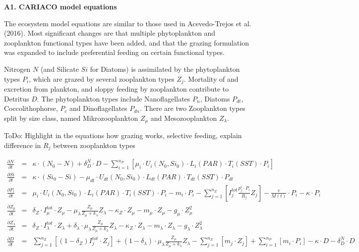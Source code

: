 \documentclass[11pt,letterpaper,english]{article}
\begin{document}
\newcommand{\etal}{{\em et al.}}
\newcommand{\ux}{{\underline{x}}}
\newcommand{\tdt}{{t}} 

{\bf {\large A1. CARIACO model equations}} 

The ecosystem model equations are similar to those used in Acevedo-Trejos et al. (2016).
Most significant changes are that multiple phytoplankton and zooplankton functional types have been added, and that the grazing formulation was expanded to include preferential feeding on certain functional types.

Nitrogen $N$ (and Silicate $Si$ for Diatoms) is assimilated by the phytoplankton types $P_i$, which are grazed by several zooplankton types $Z_j$. Mortality of and excretion from plankton, and sloppy feeding by zooplankton contribute to Detritus $D$. The phytoplankton types include Nanoflagellates $P_{n}$, Diatoms $P_{dt}$, Coccolithophorse, $P_{c}$ and Dinoflagellates $P_{dn}$. There are two Zooplankton types split by size class, named Mikrozooplankton $Z_{\mu}$ and Mesozooplankton $Z_{\lambda}$.

ToDo:  
Highlight in the equations how grazing works, selective feeding, explain difference in $R_j$ between zooplankton types

\begin{eqnarray}
\frac{\partial N}{\partial t} & = & 
\kappa \cdot \left(N_{0} - N\right) + 
\delta^{N}_{D} \cdot D -
\sum_{i=1}^{n_P} [\mu_i \cdot U_{i}(N_0,Si_0)\cdot L_i(PAR)\cdot T_i(SST) \cdot P_{i}] 
\nonumber \\
\frac{\partial Si}{\partial t} & = & 
\kappa \cdot \left(Si_{0} - Si\right) 
- \mu_{dt} \cdot U_{dt}(N_0,Si_0) \cdot L_{dt}(PAR)\cdot T_{dt}(SST) \cdot P_{dt}
\nonumber \\
\frac{\partial P_{i}}{\partial t} & = & 
\mu_{i} \cdot U_{i}(N_0,Si_0)\cdot L_{i}(PAR)\cdot T_{i}(SST) \cdot P_{i}
- m_{i} \cdot P_{i}
- \sum_{j=1}^{n_Z} [I^{tot}_j \frac{p^i_{j} \cdot P_{i}} {R_{j}} Z_{j}] -
\frac{v}{M(t)} \cdot P_{i} -
\kappa \cdot P_{i}
\nonumber \\
\frac{\partial Z_{\mu}}{\partial t} & = & 
\delta_Z \cdot I^{tot}_{\mu} \cdot Z_{\mu}-
\mu^{}_{\lambda} \frac{Z_{\mu}}{Z_{\mu}+k_{\lambda}} Z_{\lambda}-
\kappa_{Z} \cdot Z_{\mu} -
m_{\mu} \cdot Z_{\mu} - 
g_{\mu} \cdot Z_{\mu}^{2}
\nonumber \\
\frac{\partial Z_{\lambda}}{\partial t} & = & 
\delta_Z \cdot I^{tot}_{\lambda} \cdot Z_{\lambda}+
\delta_{\lambda} \cdot \mu^{}_{\lambda} \frac{Z_{\mu}}{Z_{\mu}+k_{\lambda}} Z_{\lambda}-
\kappa_{Z} \cdot Z_{\lambda} -
m_{\lambda} \cdot Z_{\lambda} - 
g_{\lambda} \cdot Z_{\lambda}^{2}
\nonumber \\
\frac{\partial D}{\partial t} & = & 
\sum_{j=1}^{n_Z} [(1-\delta_Z) I^{tot}_j \cdot Z_{j}] +
(1-\delta_{\lambda}) \cdot \mu^{}_{\lambda} \frac{Z_{\mu}}{Z_{\mu}+k_{\lambda}} Z_{\lambda}-
\sum_{j=1}^{n_Z} [m_j \cdot Z_{j}] +
\sum_{i=1}^{n_P} [m_i \cdot P_{i}] -
\kappa \cdot D -
\delta^{N}_{D} \cdot D
\nonumber
\end{eqnarray}
 
\end{document}
